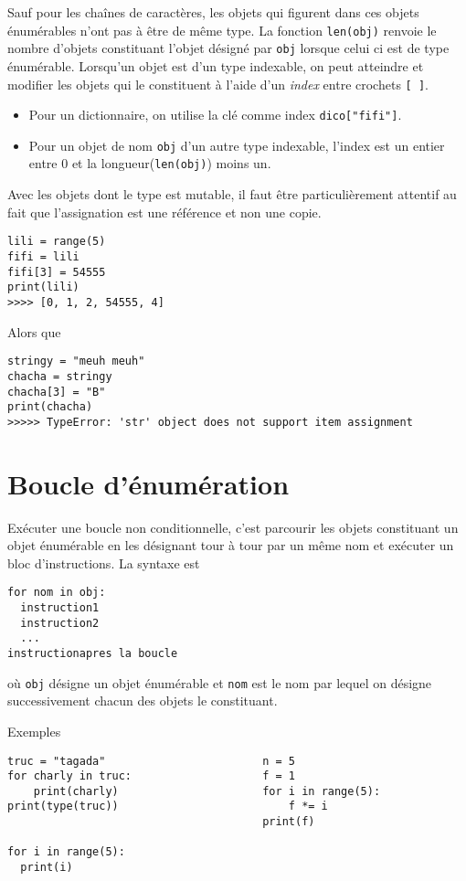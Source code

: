 Sauf pour les chaînes de caractères, les objets qui figurent dans ces objets énumérables n'ont pas à être de même type.\newline
La fonction \verb|len(obj)| renvoie le nombre d'objets constituant l'objet désigné par \verb|obj| lorsque celui ci est de type énumérable.\newline
Lorsqu'un objet est d'un type indexable, on peut atteindre et modifier les objets qui le constituent à l'aide d'un \emph{index} entre crochets \verb|[ ]|.
\begin{itemize}
 \item Pour un dictionnaire, on utilise la clé comme index \verb|dico["fifi"]|.
 \item Pour un objet de nom \verb|obj| d'un autre type indexable, l'index est un entier entre 0 et la longueur(\verb|len(obj)|) moins un. 
\end{itemize}
Avec les objets dont le type est mutable, il faut être particulièrement attentif au fait que l'assignation est une référence et non une copie.
\begin{verbatim}
lili = range(5)
fifi = lili
fifi[3] = 54555
print(lili)
>>>> [0, 1, 2, 54555, 4]\end{verbatim}
Alors que 
\begin{verbatim}
stringy = "meuh meuh"
chacha = stringy
chacha[3] = "B"
print(chacha)
>>>>> TypeError: 'str' object does not support item assignment\end{verbatim}

\section{Boucle d'énumération}
Exécuter une boucle non conditionnelle, c'est parcourir les objets constituant un objet énumérable en les désignant tour à tour par un même nom et exécuter un bloc d'instructions. 
La syntaxe est
\begin{verbatim}
for nom in obj:
  instruction1
  instruction2
  ...
instructionapres la boucle\end{verbatim}
où \texttt{obj} désigne un objet énumérable et \texttt{nom} est le nom par lequel on désigne successivement chacun des objets le constituant. 

Exemples
\begin{verbatim}
truc = "tagada"                        n = 5                     
for charly in truc:                    f = 1
    print(charly)                      for i in range(5):
print(type(truc))                          f *= i
                                       print(f)
                                       
for i in range(5):
  print(i)
                                       \end{verbatim}

